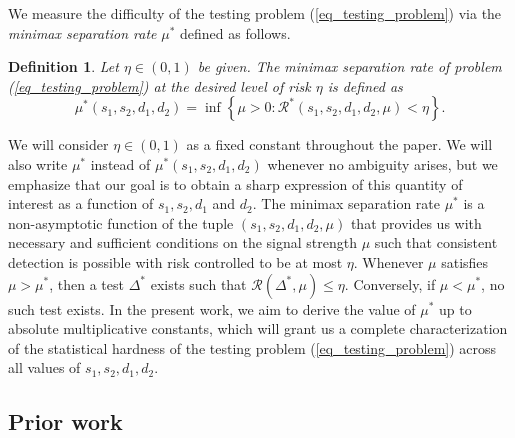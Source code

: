 \documentclass{article}
\newcommand{\cR}{\mathcal{R}}
\newtheorem{definition}{Definition}
\theoremstyle{remark}
\begin{document}
\noindent We measure the difficulty of the testing problem (\ref{eq_testing_problem}) via the \textit{minimax separation rate} $\mu^*$ defined as follows.
\begin{definition}
Let $\eta \in (0,1)$ be given. The minimax separation rate of problem (\ref{eq_testing_problem}) at the desired level of risk $\eta$ is defined as
    \begin{equation}\label{eq_minimax_rate}
    \mu^*(s_1, s_2, d_1, d_2) = \inf \left\{\mu>0: \cR^*(s_1,s_2,d_1,d_2,\mu) < \eta\right\}.
\end{equation}
\end{definition}

We will consider $\eta \in (0,1)$ as a fixed constant throughout the paper. We will also write $\mu^*$ instead of $\mu^*(s_1,s_2, d_1, d_2)$ whenever no ambiguity arises, but we emphasize that our goal is to obtain a sharp expression of this quantity of interest as a function of $s_1, s_2, d_1$ and $d_2$. The minimax separation rate $\mu^*$ is a non-asymptotic function of the tuple $(s_1, s_2, d_1, d_2, \mu)$ that provides us with necessary and sufficient conditions on the signal strength $\mu$ such that consistent detection is possible with risk controlled to be at most $\eta$. Whenever $\mu$ satisfies $\mu > \mu^*$, then a test $\Delta^*$ exists such that $\cR(\Delta^*, \mu) \leq \eta$. Conversely, if $\mu < \mu^*$, no such test exists. In the present work, we aim to derive the value of $\mu^*$ up to absolute multiplicative constants, which will grant us a complete characterization of the statistical hardness of the testing problem (\ref{eq_testing_problem}) across all values of $s_1, s_2, d_1, d_2$.


\subsection{Prior work}
\end{document}
